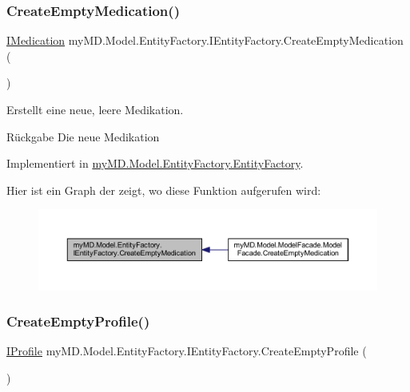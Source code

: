 \subsubsection{\texorpdfstring{Create\+Empty\+Medication()}{CreateEmptyMedication()}}
{\footnotesize\ttfamily \mbox{\hyperlink{interfacemy_m_d_1_1_model_interface_1_1_data_model_interface_1_1_i_medication}{I\+Medication}} my\+M\+D.\+Model.\+Entity\+Factory.\+I\+Entity\+Factory.\+Create\+Empty\+Medication (\begin{DoxyParamCaption}{ }\end{DoxyParamCaption})}



Erstellt eine neue, leere Medikation. 

\begin{DoxyReturn}{Rückgabe}
Die neue Medikation
\end{DoxyReturn}


Implementiert in \mbox{\hyperlink{classmy_m_d_1_1_model_1_1_entity_factory_1_1_entity_factory_a600515af5e312dbafa6dff80dfe5f25e}{my\+M\+D.\+Model.\+Entity\+Factory.\+Entity\+Factory}}.

Hier ist ein Graph der zeigt, wo diese Funktion aufgerufen wird\+:
\nopagebreak
\begin{figure}[H]
\begin{center}
\leavevmode
\includegraphics[width=350pt]{interfacemy_m_d_1_1_model_1_1_entity_factory_1_1_i_entity_factory_a02bf5fe00d1c0b40dbc510ce74619a33_icgraph}
\end{center}
\end{figure}
\mbox{\label{interfacemy_m_d_1_1_model_1_1_entity_factory_1_1_i_entity_factory_add734631a85e6021f04c4185f66e351d}} 
\subsubsection{\texorpdfstring{Create\+Empty\+Profile()}{CreateEmptyProfile()}}
{\footnotesize\ttfamily \mbox{\hyperlink{interfacemy_m_d_1_1_model_interface_1_1_data_model_interface_1_1_i_profile}{I\+Profile}} my\+M\+D.\+Model.\+Entity\+Factory.\+I\+Entity\+Factory.\+Create\+Empty\+Profile (\begin{DoxyParamCaption}{ }\end{DoxyParamCaption})}



